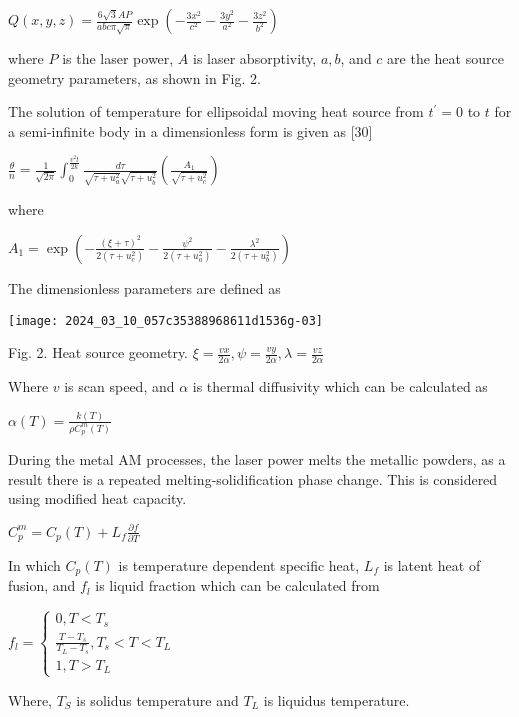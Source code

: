 \documentclass[10pt]{article}
\begin{document}
$Q(x, y, z)=\frac{6 \sqrt{3} A P}{a b c \pi \sqrt{\pi}} \exp \left(-\frac{3 x^{2}}{c^{2}}-\frac{3 y^{2}}{a^{2}}-\frac{3 z^{2}}{b^{2}}\right)$

where $P$ is the laser power, $A$ is laser absorptivity, $a, b$, and $c$ are the heat source geometry parameters, as shown in Fig. 2.

The solution of temperature for ellipsoidal moving heat source from $t^{\prime}=0$ to $t$ for a semi-infinite body in a dimensionless form is given as [30]

$\frac{\theta}{n}=\frac{1}{\sqrt{2 \pi}} \int_{0}^{\frac{v^{2} t}{2 k}} \frac{d \tau}{\sqrt{\tau+u_{a}^{2}} \sqrt{\tau+u_{b}^{2}}}\left(\frac{A_{1}}{\sqrt{\tau+u_{c}^{2}}}\right)$

where

$A_{1}=\exp \left(-\frac{(\xi+\tau)^{2}}{2\left(\tau+u_{c}^{2}\right)}-\frac{\psi^{2}}{2\left(\tau+u_{a}^{2}\right)}-\frac{\lambda^{2}}{2\left(\tau+u_{b}^{2}\right)}\right)$

The dimensionless parameters are defined as

\begin{center}
\texttt{[image: 2024\_03\_10\_057c35388968611d1536g-03]}
\end{center}

Fig. 2. Heat source geometry. $\xi=\frac{v x}{2 \alpha}, \psi=\frac{v y}{2 \alpha}, \lambda=\frac{v z}{2 \alpha}$

Where $v$ is scan speed, and $\alpha$ is thermal diffusivity which can be calculated as

$\alpha(T)=\frac{k(T)}{\rho C_{p}^{m}(T)}$

During the metal AM processes, the laser power melts the metallic powders, as a result there is a repeated melting-solidification phase change. This is considered using modified heat capacity.

$C_{p}^{m}=C_{p}(T)+L_{f} \frac{\partial f}{\partial T}$

In which $C_{p}(T)$ is temperature dependent specific heat, $L_{f}$ is latent heat of fusion, and $f_{l}$ is liquid fraction which can be calculated from

$f_{l}=\left\{\begin{array}{c}0, T<T_{s} \\ \frac{T-T_{s}}{T_{L}-T_{s}}, T_{s}<T<T_{L} \\ 1, T>T_{L}\end{array}\right.$

Where, $T_{S}$ is solidus temperature and $T_{L}$ is liquidus temperature.
\end{document}
